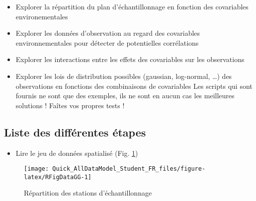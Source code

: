 \documentclass[french,a4paper]{article}
\providecommand{\tightlist}{%
  \setlength{\itemsep}{0pt}\setlength{\parskip}{0pt}}
\begin{document}
\begin{itemize}
\tightlist
\item
  Explorer la répartition du plan d'échantillonnage en fonction des
  covariables environementales
\item
  Explorer les données d'observation au regard des covariables
  environnementales pour détecter de potentielles corrélations
\item
  Explorer les interactions entre les effets des covariables sur les
  observations
\item
  Explorer les lois de distribution possibles (gaussian, log-normal,
  \ldots{}) des observations en fonctions des combinaisons de
  covariables \nopandoc{\begin{redbox}} Les scripts qui sont fournis ne
  sont que des exemples, ils ne sont en aucun cas les meilleures
  solutions ! Faîtes vos propres tests ! \nopandoc{\end{redbox}}
\end{itemize}

\hypertarget{liste-des-differentes-etapes}{%
\subsection{Liste des différentes
étapes}\label{liste-des-differentes-etapes}}

\begin{itemize}
\tightlist
\item
  Lire le jeu de données spatialisé (Fig. \ref{fig:RFigDataGG})
\end{itemize}



\begin{figure}[!h]

{\centering \texttt{[image: Quick\_AllDataModel\_Student\_FR\_files/figure-latex/RFigDataGG-1]} 

}

\caption{Répartition des stations d'échantillonnage}\label{fig:RFigDataGG}
\end{figure}
\end{document}
